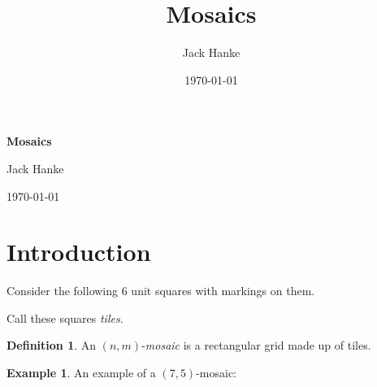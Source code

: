 \documentclass[12pt]{article}
\title{Mosaics}
\author{Jack Hanke}
\date{\today}
\theoremstyle{plain}
\theoremstyle{definition}
\theoremstyle{remark}
\theoremstyle{definition}
\newtheorem{definition}{Definition}[section]
\newtheorem{exmp}{Example}[section]
\newcommand{\cellA}[4]{ \draw[thick] ( #1 , #2 ) rectangle ( #3 , #4 ); \draw[red, thick] (#3 * 0.5 + #1 * 0.5 , #2) -- (#3, #4 * 0.5 + #2 * 0.5);}
\newcommand{\cellB}[4]{ \draw[thick] ( #1 , #2 ) rectangle ( #3 , #4 ); \draw[red, thick] (#3 * 0.5 + #1 * 0.5 , #2) -- (#1, #4 * 0.5 + #2 * 0.5);}
\newcommand{\cellC}[4]{ \draw[thick] ( #1 , #2 ) rectangle ( #3 , #4 ); \draw[red, thick] (#3 * 0.5 + #1 * 0.5 , #4) -- (#1, #4 * 0.5 + #2 * 0.5);}
\newcommand{\cellD}[4]{ \draw[thick] ( #1 , #2 ) rectangle ( #3 , #4 ); \draw[red, thick] (#3 * 0.5 + #1 * 0.5 , #4) -- (#3, #4 * 0.5 + #2 * 0.5);}
\newcommand{\cellE}[4]{ \draw[thick] ( #1 , #2 ) rectangle ( #3 , #4 ); \draw[red, thick] (#3 * 0.5 + #1 * 0.5 , #2) -- (#3 * 0.5 + #1 * 0.5 , #4);}
\newcommand{\cellF}[4]{ \draw[thick] ( #1 , #2 ) rectangle ( #3 , #4 ); \draw[red, thick] (#3, #4 * 0.5 + #2 * 0.5) -- (#1, #4 * 0.5 + #2 * 0.5);}
\begin{document}
\begin{center}
    \Large
    \textbf{Mosaics}
    
    \vspace{0.4cm}
    \large
    
    Jack Hanke   
    \vspace{0.4cm}
    
    \today
    \vspace{0.4cm}    
\end{center}

\section{Introduction}

Consider the following $6$ unit squares with markings on them.

\begin{center}
\end{center}

Call these squares \textit{tiles}. 

\begin{definition}
An $(n,m)$-\textit{mosaic} is a rectangular grid made up of tiles.
\end{definition}

\begin{exmp}
An example of a $(7,5)$-mosaic:
\begin{center}
\end{center}
\end{exmp}
\end{document}
